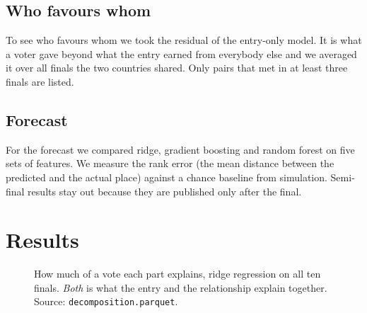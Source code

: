 \documentclass[a4paper,10pt]{article}
\begin{document}
\subsection{Who favours whom}

To see who favours whom we took the residual of the entry-only model.
It is what a voter gave beyond what the entry earned from everybody else and we averaged it over all finals the two countries shared.
Only pairs that met in at least three finals are listed.

\subsection{Forecast}

For the forecast we compared ridge, gradient boosting and random forest on five sets of features.
We measure the rank error (the mean distance between the predicted and the actual place) against a chance baseline from simulation.
Semi-final results stay out because they are published only after the final.

\section{Results}
\label{sec:results}

\begin{figure}[t]
\centering
{}
\caption{How much of a vote each part explains, ridge regression on all ten finals. \emph{Both} is what the entry and the relationship explain together. Source: \texttt{decomposition.parquet}.}
\label{fig:split}
\end{figure}
\end{document}

